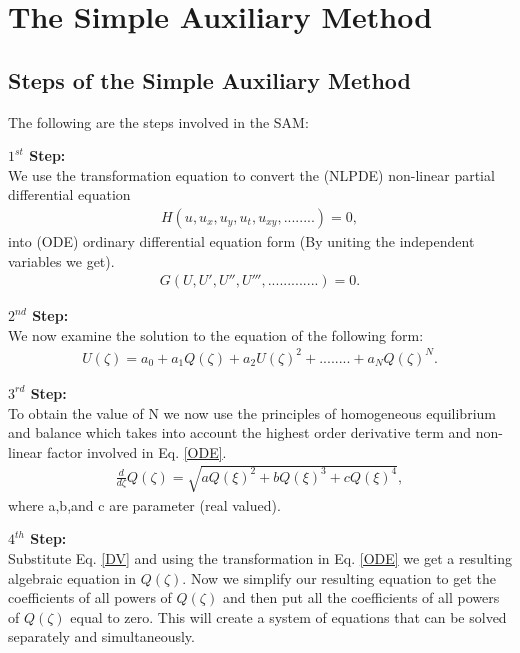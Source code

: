 \documentclass[10pt]{NSP1}
\numberwithin{equation}{section}
\begin{document}
\section{The Simple Auxiliary Method}

\subsection{Steps of the Simple Auxiliary Method}

The following are the steps involved in the SAM:

\textbf{$1^{st}$ Step:}\\
We use the transformation equation to convert the (NLPDE) non-linear partial differential equation
\begin{eqnarray}\label{NLPDE}
H(u,u_x,u_y,u_t,u_{xy},........)=0,
\end{eqnarray}
into (ODE) ordinary differential equation form (By uniting the independent variables we get).
\begin{eqnarray}\label{ODE}
G(U,U',U'',U''',.............)=0.
\end{eqnarray}

\textbf{$2^{nd}$ Step:}\\
We now examine the solution to the equation of the following form:
\begin{eqnarray}\label{TF}
U \! \left(\zeta \right)= a_{0} + a_{1} Q \! \left(\zeta \right)+ a_{2} {U \! \left(\zeta \right)}^{2} +........+a_{N} {Q \! \left(\zeta \right)}^{N}.
\end{eqnarray}

\textbf{$3^{rd}$ Step:}\\
To obtain the value of N we now use the principles of homogeneous equilibrium and balance which takes into account the highest order derivative term and non-linear factor involved in Eq. \ref{ODE}.
\begin{eqnarray}\label{DV}
\frac{d}{d \zeta}Q \! \left(\zeta \right) =\sqrt{a Q \! \left(\xi \right)^{2}+b Q \! \left(\xi \right)^{3}+c Q \! \left(\xi \right)^{4}},
\end{eqnarray}
where a,b,and c are parameter (real valued).

\textbf{$4^{th}$ Step:}\\
Substitute Eq. \ref{DV} and using the transformation in Eq. \ref{ODE} we get a resulting algebraic equation in ${Q(\zeta)}$. Now we simplify our resulting equation to get the coefficients of all powers of ${Q(\zeta)}$ and then put all the coefficients of all powers of $Q{(\zeta)}$ equal to zero. This will create a system of equations that can be solved separately and simultaneously.
\end{document}
